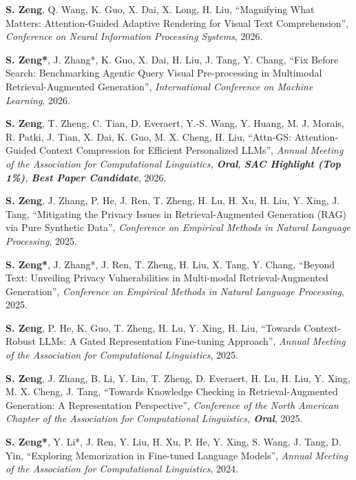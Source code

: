 \documentclass[12pt,letterpaper]{article}
\newenvironment{publist}{%
  \begin{list}{}{%
    \setlength{\leftmargin}{34mm}%
    \setlength{\labelwidth}{32mm}%
    \setlength{\labelsep}{2mm}%
    \setlength{\itemsep}{1.5mm}%
    \setlength{\parsep}{0pt}%
    \setlength{\topsep}{1.5mm}%
    \renewcommand{\makelabel}[1]{\bfseries\color{accent}##1\hfill}%
  }}{\end{list}}
\newcommand{\pubgroup}[1]{\vspace{1.5mm}{\bfseries\large\color{accent}#1}\vspace{-0.5mm}}
\begin{document}
\pubgroup{First-Authored Publications}
\begin{publist}
\item[{[NeurIPS'26]}] \textbf{S. Zeng}, Q. Wang, K. Guo, X. Dai, X. Long, H. Liu, ``Magnifying What Matters: Attention-Guided Adaptive Rendering for Visual Text Comprehension'', \textit{Conference on Neural Information Processing Systems}, 2026.
\item[{[ICML'26]}] \textbf{S. Zeng*}, J. Zhang*, K. Guo, X. Dai, H. Liu, J. Tang, Y. Chang, ``Fix Before Search: Benchmarking Agentic Query Visual Pre-processing in Multimodal Retrieval-Augmented Generation'', \textit{International Conference on Machine Learning}, 2026.
\item[{[ACL'26, Oral]}] \textbf{S. Zeng}, T. Zheng, C. Tian, D. Everaert, Y.-S. Wang, Y. Huang, M. J. Morais, R. Patki, J. Tian, X. Dai, K. Guo, M. X. Cheng, H. Liu, ``Attn-GS: Attention-Guided Context Compression for Efficient Personalized LLMs'', \textit{Annual Meeting of the Association for Computational Linguistics, \textbf{\color{honor}Oral}, \textbf{\color{honor}SAC Highlight (Top 1\%)}, \textbf{\color{honor}Best Paper Candidate}}, 2026.
\item[{[EMNLP'25]}] \textbf{S. Zeng}, J. Zhang, P. He, J. Ren, T. Zheng, H. Lu, H. Xu, H. Liu, Y. Xing, J. Tang, ``Mitigating the Privacy Issues in Retrieval-Augmented Generation (RAG) via Pure Synthetic Data'', \textit{Conference on Empirical Methods in Natural Language Processing}, 2025.
\item[{[EMNLP'25]}] \textbf{S. Zeng*}, J. Zhang*, J. Ren, T. Zheng, H. Liu, X. Tang, Y. Chang, ``Beyond Text: Unveiling Privacy Vulnerabilities in Multi-modal Retrieval-Augmented Generation'', \textit{Conference on Empirical Methods in Natural Language Processing}, 2025.
\item[{[ACL'25]}] \textbf{S. Zeng}, P. He, K. Guo, T. Zheng, H. Lu, Y. Xing, H. Liu, ``Towards Context-Robust LLMs: A Gated Representation Fine-tuning Approach'', \textit{Annual Meeting of the Association for Computational Linguistics}, 2025.
\item[{[NAACL'25, Oral]}] \textbf{S. Zeng}, J. Zhang, B. Li, Y. Lin, T. Zheng, D. Everaert, H. Lu, H. Liu, Y. Xing, M. X. Cheng, J. Tang, ``Towards Knowledge Checking in Retrieval-Augmented Generation: A Representation Perspective'', \textit{Conference of the North American Chapter of the Association for Computational Linguistics, \textbf{\color{honor}Oral}}, 2025.
\item[{[ACL'24]}] \textbf{S. Zeng*}, Y. Li*, J. Ren, Y. Liu, H. Xu, P. He, Y. Xing, S. Wang, J. Tang, D. Yin, ``Exploring Memorization in Fine-tuned Language Models'', \textit{Annual Meeting of the Association for Computational Linguistics}, 2024.

\end{publist}
\end{document}
